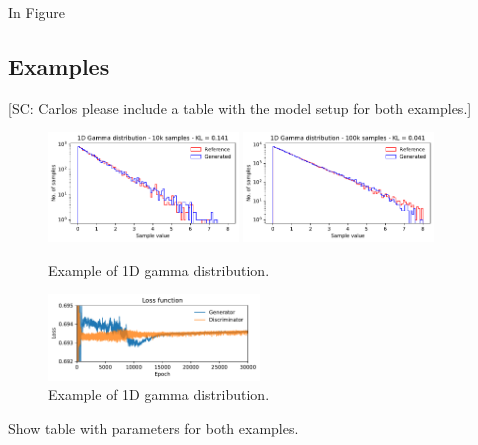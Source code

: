 \documentclass[twocolumn,preprintnumbers,superscriptaddress]{revtex4-2}
\begin{document}
In Figure

\subsection{Examples}

{\color{red}[SC: Carlos please include a table with the model setup for both examples.]}

\begin{figure}
  \includegraphics[width=0.45\textwidth]{plots/1Dgamma/1Dgamma_distribution_10k.pdf}
  \includegraphics[width=0.45\textwidth]{plots/1Dgamma/1Dgamma_distribution_100k.pdf}
  \caption{Example of 1D gamma distribution.}
\end{figure}

\begin{figure}
  \includegraphics[width=0.5\textwidth]{plots/1Dgamma/1Dgamma_loss.pdf}
  \caption{Example of 1D gamma distribution.}
\end{figure}

Show table with parameters for both examples.
\end{document}
